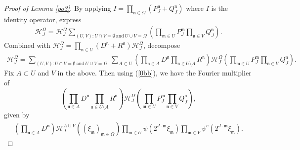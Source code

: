 \documentclass[10pt,a4paper]{amsart}
\numberwithin{equation}{section}
\begin{document}
\begin{proof}[Proof of Lemma \ref{po3}]
	 By applying $I=\prod_{\mathfrak{n}\in \Omega} (P_J^{\mathfrak{n}} +  Q_J^{\mathfrak{n}}) $ where $I$ is the identity operator, express 
	\begin{align}
		\mathcal{H}^{\Omega}_J=\mathcal{H}^{\Omega}_J \sum_{(U,V): U\cap V=\emptyset \  \text{and}\ U\cup V=\Omega} \left( \prod_{\mathfrak{m}\in U}P_J^{\mathfrak{m}}  \prod_{\mathfrak{n}\in V}Q_J^{\mathfrak{n}} \right).
	\end{align}
	Combined with $\mathcal{H}^{\Omega}_J= \prod_{\mathfrak{n}\in U}( D^{\mathfrak{n}} + R^{\mathfrak{n}})\mathcal{H}^{\Omega}_J $, decompose  
	\begin{align}\label{ss33}
		\mathcal{H}^{\Omega}_J=  \sum_{(U,V): U\cap V=\emptyset \  \text{and}\ U\cup V=\Omega} \ \sum_{A\subset U} \left(\prod_{\mathfrak{n}\in   A} D^{\mathfrak{n}}\prod_{\mathfrak{n}\in U\setminus A} R^{\mathfrak{n}}\right)\mathcal{H}^{\Omega}_J \left(\prod_{\mathfrak{m}\in U}  P_J^{\mathfrak{m}}  \prod_{\mathfrak{n}\in V}Q_J^{\mathfrak{n}}\right). 
	\end{align}
	Fix $A\subset U$ and $V$ in the above.  Then using (\ref{0bb}), we have the Fourier multiplier of $$\left(\prod_{\mathfrak{n}\in   A} D^{\mathfrak{n}}\prod_{\mathfrak{n}\in U\setminus A} R^{\mathfrak{n}}\right)\mathcal{H}^{\Omega}_J \left(\prod_{\mathfrak{m}\in U}  P_J^{\mathfrak{m}}  \prod_{\mathfrak{n}\in V}Q_J^{\mathfrak{n}}\right),$$ given by
	\begin{align*}
		\left( \prod_{\mathfrak{n}\in   A} D^{\mathfrak{n}} \right)\mathcal{H}_J^{A\cup V} \left((\xi_{\mathfrak{m}} )_{\mathfrak{m}\in \Omega} \right) \prod_{\mathfrak{m}\in U}  \psi \left(2^{J\cdot \mathfrak{m}} \xi_{\mathfrak{m}} \right)    \prod_{\mathfrak{m}\in V}\psi^c\left(2^{J\cdot \mathfrak{m}} \xi_{\mathfrak{m}} \right).  
	\end{align*}
	

\end{proof}
\end{document}
